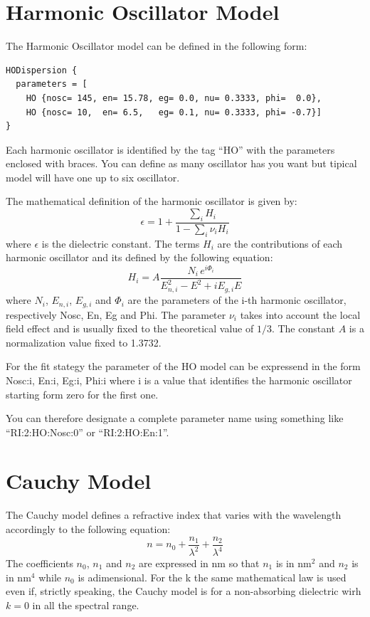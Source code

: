\documentclass[a4paper]{report}
\begin{document}
\section{Harmonic Oscillator Model}
The Harmonic Oscillator model can be defined in the following form:
\begin{verbatim}
HODispersion {
  parameters = [
    HO {nosc= 145, en= 15.78, eg= 0.0, nu= 0.3333, phi=  0.0},
    HO {nosc= 10,  en= 6.5,   eg= 0.1, nu= 0.3333, phi= -0.7}]
}
\end{verbatim}
Each harmonic oscillator is identified by the tag ``HO'' with the parameters enclosed with braces.
You can define as many oscillator has you want but tipical model will have one up to six oscillator.

The mathematical definition of the harmonic oscillator is given by:
\begin{equation}
  \epsilon = 1 + \frac{\sum_i H_i}{1 - \sum_i \nu_i H_i}
\end{equation}
where $\epsilon$ is the dielectric constant.
The terms $H_i$ are the contributions of each harmonic oscillator and its defined by the following equation:
\begin{equation}
  H_i = A \frac{N_i \, e^{i \Phi_i}}{E_{n,i}^2 - E^2 + i E_{g,i} E}
\end{equation}
where $N_i$, $E_{n,i}$, $E_{g,i}$ and $\Phi_i$ are the parameters of the i-th harmonic oscillator, respectively Nosc, En, Eg and Phi.
The parameter $\nu_i$ takes into account the local field effect and is usually fixed to the theoretical value of $1/3$.
The constant $A$ is a normalization value fixed to 1.3732.

For the fit stategy the parameter of the HO model can be expressend in the form Nosc:i, En:i, Eg:i, Phi:i where i is a value that identifies the harmonic oscillator starting form zero for the first one.

You can therefore designate a complete parameter name using something like ``RI:2:HO:Nosc:0'' or ``RI:2:HO:En:1''.

\section{Cauchy Model}

The Cauchy model defines a refractive index that varies with the wavelength accordingly to the following equation:
\begin{equation}
  n = n_0 + \frac{n_1}{\lambda^2} + \frac{n_2}{\lambda^4}
\end{equation}
The coefficients $n_0$, $n_1$ and $n_2$ are expressed in $\textrm{nm}$ so that $n_1$ is in $\textrm{nm}^2$ and $n_2$ is in $\textrm{nm}^4$ while $n_0$ is adimensional.
For the k the same mathematical law is used even if, strictly speaking, the Cauchy model is for a non-absorbing dielectric wirh $k = 0$ in all the spectral range.
\end{document}
